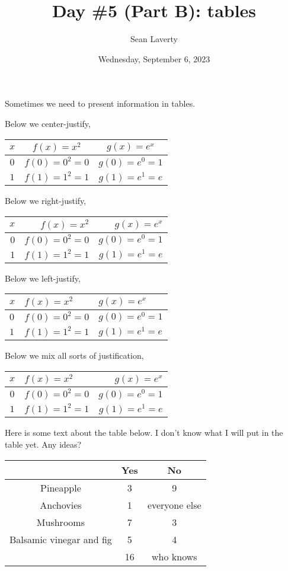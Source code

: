\documentclass[12pt]{article}
\title{Day \#5 (Part B): tables}
\author{Sean Laverty}
\date{Wednesday, September 6, 2023}
\begin{document}
\maketitle
\newpage

Sometimes we need to present information in tables.

Below we center-justify,

\begin{tabular}{c|c|c} %
\(x\) & \(f(x) = x^{2}\) & \(g(x) = e^{x}\)\\
\hline\hline
\(0\) & \(f(0) = 0^{2} = 0 \) & \(g(0) = e^{0} = 1\)\\
\(1\) & \(f(1) = 1^{2} = 1 \) & \(g(1) = e^{1} = e\)\\\end{tabular}

Below we right-justify,

\begin{tabular}{r|r|r} %
\(x\) & \(f(x) = x^{2}\) & \(g(x) = e^{x}\)\\
\hline\hline
\(0\) & \(f(0) = 0^{2} = 0 \) & \(g(0) = e^{0} = 1\)\\
\(1\) & \(f(1) = 1^{2} = 1 \) & \(g(1) = e^{1} = e\)\\\end{tabular}

Below we left-justify,

\begin{tabular}{lll} %
\(x\) & \(f(x) = x^{2}\) & \(g(x) = e^{x}\)\\
\hline\hline
\(0\) & \(f(0) = 0^{2} = 0 \) & \(g(0) = e^{0} = 1\)\\
\(1\) & \(f(1) = 1^{2} = 1 \) & \(g(1) = e^{1} = e\)\\\end{tabular}

Below we mix all sorts of justification,

\begin{tabular}{cp{2in}r} %
\(x\) & \(f(x) = x^{2}\) & \(g(x) = e^{x}\)\\
\hline\hline
\(0\) & \(f(0) = 0^{2} = 0 \) & \(g(0) = e^{0} = 1\)\\
\(1\) & \(f(1) = 1^{2} = 1 \) & \(g(1) = e^{1} = e\)\\\end{tabular}

\newpage
Here is some text about the table below. I don't know what I will put in the table yet. Any ideas?

\begin{tabular}{c|cc}
& Yes & No \\
\hline
Pineapple & 3 & 9\\
Anchovies & 1 & everyone else\\
Mushrooms & 7 & 3\\
Balsamic vinegar and fig & 5 & 4\\
\hline
& 16 & who knows
\end{tabular}
\end{document}
